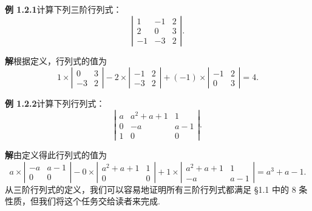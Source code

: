 \documentclass[UTF8, 12pt, fontset=fandol, oneside]{ctexart}
\begin{document}
\noindent\textbf{例 1.2.1}\quad 计算下列三阶行列式：
\[
\left|\begin{array}{ccc}
1 & -1 & 2\\
2 & 0 & 3\\
-1 & -3 & 2
\end{array}\right|.
\]

\noindent\textbf{解}\quad 根据定义，行列式的值为
\[
1\times
\left|\begin{array}{cc}
0 & 3\\
-3 & 2
\end{array}\right|
-2\times
\left|\begin{array}{cc}
-1 & 2\\
-3 & 2
\end{array}\right|
+(-1)\times
\left|\begin{array}{cc}
-1 & 2\\
0 & 3
\end{array}\right|
=4.
\]

\noindent\textbf{例 1.2.2}\quad 计算下列行列式：
\[
\left|\begin{array}{ccc}
a & a^2+a+1 & 1\\
0 & -a & a-1\\
1 & 0 & 0
\end{array}\right|.
\]

\noindent\textbf{解}\quad 由定义得此行列式的值为
\[
a\times
\left|\begin{array}{cc}
-a & a-1\\
0 & 0
\end{array}\right|
-0\times
\left|\begin{array}{cc}
a^2+a+1 & 1\\
0 & 0
\end{array}\right|
+1\times
\left|\begin{array}{cc}
a^2+a+1 & 1\\
-a & a-1
\end{array}\right|
=a^3+a-1.
\]
从三阶行列式的定义，我们可以容易地证明所有三阶行列式都满足 §1.1 中的 8 条性质，但我们将这个任务交给读者来完成.
\end{document}
